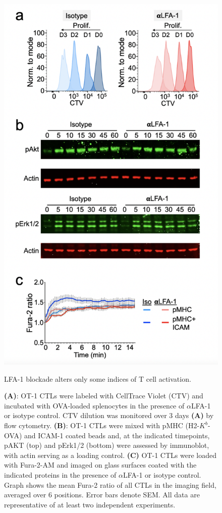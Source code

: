 \begin{figure}[htbp]
	\centering
	\includegraphics[width=0.7\columnwidth]{../figures/chapter3/fig1suppactiv.png}
	\caption{LFA-1 blockade alters only some indices of T cell activation.}
	\caption*{\textbf{(A)}: OT-1 CTLs were labeled with CellTrace Violet (CTV) and incubated with OVA-loaded splenocytes in the presence of $\alpha$LFA-1 or isotype control. CTV dilution was monitored over 3 days \textbf{(A)} by flow cytometry. \textbf{(B)}: OT-1 CTLs were mixed with pMHC (H2-$K^{b}$-OVA) and ICAM-1 coated beads and, at the indicated timepoints, pAKT (top) and pErk1/2 (bottom) were assessed by immunoblot, with actin serving as a loading control. \textbf{(C)} OT-1 CTLs were loaded with Fura-2-AM and imaged on glass surfaces coated with the indicated proteins in the presence of $\alpha$LFA-1 or isotype control. Graph shows the mean Fura-2 ratio of all CTLs in the imaging field, averaged over 6 positions. Error bars denote SEM. All data are representative of at least two independent experiments.}
	\label{fig:fig1suppactiv}
\end{figure}

